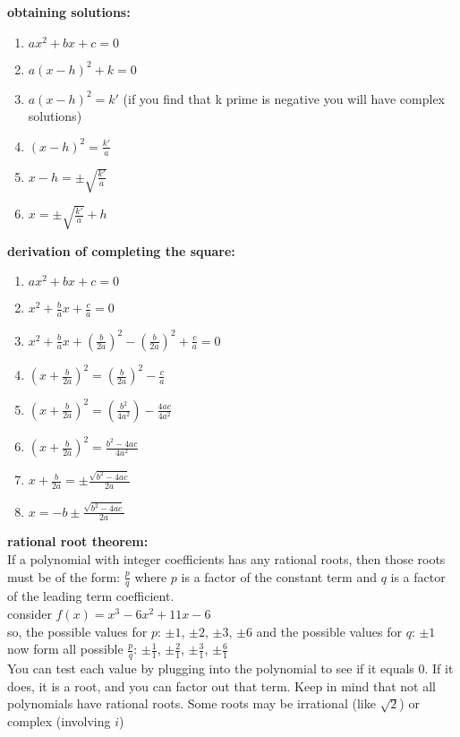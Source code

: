 \documentclass{article}
\begin{document}
\textbf{obtaining solutions:}
	\begin{enumerate}
		\item $ax^2 + bx + c = 0$
		\item $a(x - h)^2 + k = 0$
		\item $a(x - h)^2 = k'$ (if you find that k prime is negative you will have complex solutions) 
		\item $(x - h)^2 = \frac{k'}{a}$ 
		\item $x - h = \pm \sqrt{\frac{k'}{a}}$
		\item $x = \pm \sqrt{\frac{k'}{a}} + h$
	\end{enumerate}

\textbf{derivation of completing the square:}
	\begin{enumerate}
		\item $ax^2 + bx + c = 0$
		\item $x^2 + \frac{b}{a}x + \frac{c}{a} = 0$
		\item $x^2 + \frac{b}{a}x + (\frac{b}{2a})^2 - (\frac{b}{2a})^2 + \frac{c}{a} = 0$
		\item $(x + \frac{b}{2a})^2 = (\frac{b}{2a})^2 - \frac{c}{a}$
	
		\item $(x + \frac{b}{2a})^2 = (\frac{b^2}{4a^2}) - \frac{4ac}{4a^2}$
		\item $(x + \frac{b}{2a})^2 = \frac{b^2 - 4ac}{4a^2}$
		\item $x + \frac{b}{2a} = \pm \frac{\sqrt{b^2 - 4ac}}{2a}$
		\item $x = -b \pm \frac{\sqrt{b^2 - 4ac}}{2a}$
	\end{enumerate}

\textbf{rational root theorem:}\\

If a polynomial with integer coefficients has any rational roots, then those roots must be of the form: $\frac{p}{q}$ where $p$ is a factor of the constant term and $q$ is a factor of the leading term coefficient.\\

consider $f(x) = x^3 - 6x^2 + 11x - 6$\\
so, the possible values for $p$: $\pm1$, $\pm2$, $\pm3$, $\pm6$ and the possible values for $q$: $\pm1$\\
now form all possible $\frac{p}{q}$: $\pm\frac{1}{1}$, $\pm\frac{2}{1}$, $\pm\frac{3}{1}$, $\pm\frac{6}{1}$\\
You can test each value by plugging into the polynomial to see if it equals 0. If it does, it is a root, and you can factor out that term. Keep in mind that not all polynomials have rational roots. Some roots may be irrational (like $\sqrt{2}$) or complex (involving $i$)\\
\end{document}
